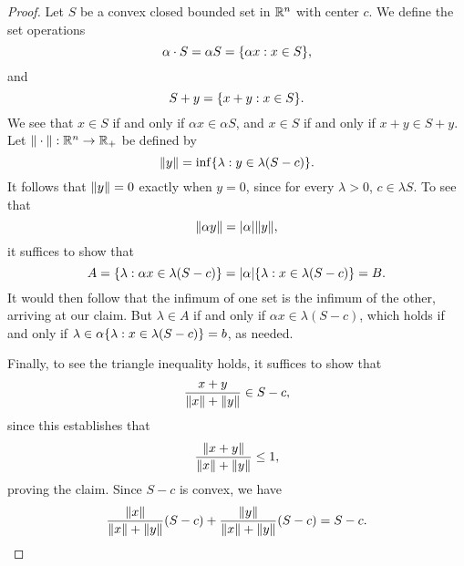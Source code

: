 \begin{proof}
    Let $S$ be a convex closed bounded set in $\mathbb{R}^n$ with center $c$. We define
    the set operations
    \[
        \alpha \cdot S = \alpha S = \{\alpha x : x \in S\},
    \]
    and
    \[
        S + y = \{x + y : x \in S\}.
    \]
    We see that $x \in S$ if and only if $\alpha x \in \alpha S$, and $x \in S$
    if and only if $x + y \in S + y$. Let $\Vert\cdot\Vert : \mathbb{R}^n
    \to \mathbb{R}_{+}$ be defined by
    \[
        \Vert y\Vert = \inf \{\lambda : y \in \lambda (S - c)\}.
    \]
    It follows that $\Vert y\Vert = 0$ exactly when $y = 0$, since for every
    $\lambda > 0$, $c \in \lambda S$. To see that
    \[
        \Vert\alpha y\Vert = |\alpha| \Vert y\Vert,
    \]
    it suffices to show that 
    \[
        A = \{\lambda : \alpha x \in \lambda (S - c)\} =
        |\alpha| \{\lambda : x \in \lambda (S - c)\} = B.
    \]
    It would then follow that the infimum of one set is the infimum of the
    other, arriving at our claim. But $\lambda \in A$ if and only if $\alpha x \in
    \lambda(S - c)$, which holds if and only if $\lambda \in \alpha \{\lambda
        : x \in \lambda (S - c)\} = b$, as needed.

    Finally, to see the triangle inequality holds, it suffices to show that 
    \[
        \frac{x + y}{\Vert x\Vert + \Vert y\Vert} \in S - c,
    \]
    since this establishes that
    \[
        \frac{\Vert x + y\Vert}{\Vert x\Vert + \Vert y\Vert} \leq 1,
    \]
    proving the claim. Since $S-c$ is convex, we have
    \[
        \frac{\Vert x\Vert}{\Vert x\Vert + \Vert y\Vert} (S - c) + 
        \frac{\Vert y\Vert}{\Vert x\Vert + \Vert y\Vert} (S - c) = 
        S - c.
    \]
\end{proof}
